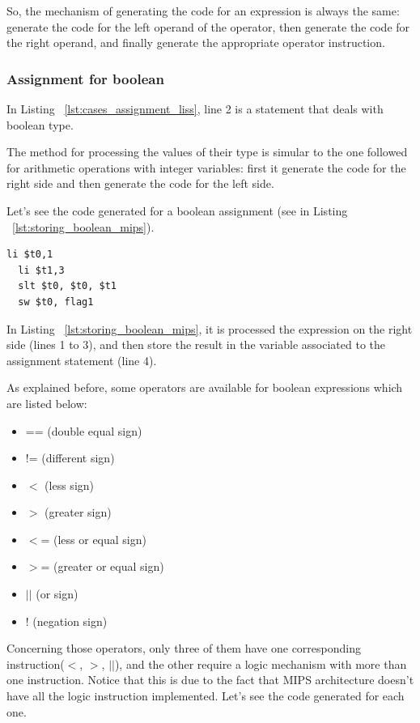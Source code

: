 \documentclass[
  oneside,
  11pt, a4paper,
  footinclude=true,
  headinclude=true,
  cleardoublepage=empty
]{scrbook}
\begin{document}
So, the mechanism of generating the code for an expression is always the same: generate the code for the left operand of the operator, then generate the code for the right operand, and finally generate the appropriate operator instruction.

\subsubsection{Assignment for boolean}

In Listing ~\ref{lst:cases_assignment_liss}, line 2 is a statement that deals with boolean type.

The method for processing the values of their type is simular to the one followed for arithmetic operations with integer variables: first it generate the code for the right side and then generate the code for the left side.

Let's see the code generated for a boolean assignment (see in Listing ~\ref{lst:storing_boolean_mips}).

\begin{lstlisting}[caption={Code generated for line 2 of  Listing ~\ref{lst:cases_assignment_liss}},label={lst:storing_boolean_mips}]
  li $t0,1		
  li $t1,3		
  slt $t0, $t0, $t1	
  sw $t0, flag1		
\end{lstlisting}

In Listing ~\ref{lst:storing_boolean_mips}, it is processed the expression on the right side (lines 1 to 3), and then store the result in the variable associated to the assignment statement (line 4).

As explained before, some operators are available for boolean expressions which are listed below:

\begin{itemize}
\item == (double equal sign)
\item != (different sign)
\item $<$ (less sign)
\item $>$ (greater sign)
\item $<$= (less or equal sign)
\item $>$= (greater or equal sign)
\item $||$ (or sign)
\item ! (negation sign)
\end{itemize}

Concerning those operators, only three of them have one corresponding instruction($<$, $>$, $||$), and the other require a logic mechanism with more than one instruction. Notice that this is due to the fact that MIPS architecture doesn't have all the logic instruction implemented.
Let's see the code generated for each one.
\end{document}

